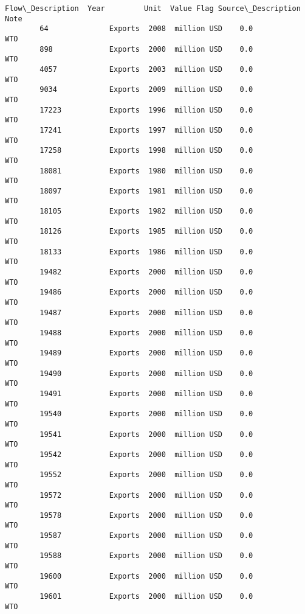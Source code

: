 \documentclass[11pt]{article}
\begin{document}
\begin{Verbatim}[commandchars=\\\{\}]
               Flow\_Description  Year         Unit  Value Flag Source\_Description Note  
        64              Exports  2008  million USD    0.0                     WTO       
        898             Exports  2000  million USD    0.0                     WTO       
        4057            Exports  2003  million USD    0.0                     WTO       
        9034            Exports  2009  million USD    0.0                     WTO       
        17223           Exports  1996  million USD    0.0                     WTO       
        17241           Exports  1997  million USD    0.0                     WTO       
        17258           Exports  1998  million USD    0.0                     WTO       
        18081           Exports  1980  million USD    0.0                     WTO       
        18097           Exports  1981  million USD    0.0                     WTO       
        18105           Exports  1982  million USD    0.0                     WTO       
        18126           Exports  1985  million USD    0.0                     WTO       
        18133           Exports  1986  million USD    0.0                     WTO       
        19482           Exports  2000  million USD    0.0                     WTO       
        19486           Exports  2000  million USD    0.0                     WTO       
        19487           Exports  2000  million USD    0.0                     WTO       
        19488           Exports  2000  million USD    0.0                     WTO       
        19489           Exports  2000  million USD    0.0                     WTO       
        19490           Exports  2000  million USD    0.0                     WTO       
        19491           Exports  2000  million USD    0.0                     WTO       
        19540           Exports  2000  million USD    0.0                     WTO       
        19541           Exports  2000  million USD    0.0                     WTO       
        19542           Exports  2000  million USD    0.0                     WTO       
        19552           Exports  2000  million USD    0.0                     WTO       
        19572           Exports  2000  million USD    0.0                     WTO       
        19578           Exports  2000  million USD    0.0                     WTO       
        19587           Exports  2000  million USD    0.0                     WTO       
        19588           Exports  2000  million USD    0.0                     WTO       
        19600           Exports  2000  million USD    0.0                     WTO       
        19601           Exports  2000  million USD    0.0                     WTO       

\end{Verbatim}
\end{document}
